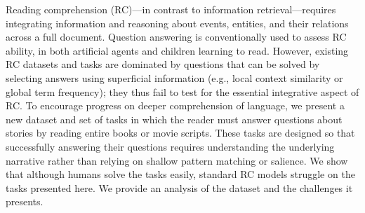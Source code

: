 Reading comprehension (RC)---in contrast to information retrieval---requires integrating information and reasoning about events, entities, and their relations across a full document. Question answering is conventionally used to assess RC ability, in both artificial agents and children learning to read. However, existing RC datasets and tasks are dominated by questions that can be solved by selecting answers using superficial information (e.g., local context similarity or global term frequency); they thus fail to test for the essential integrative aspect of RC. To encourage progress on deeper comprehension of language, we present a new dataset and set of tasks in which the reader must answer questions about stories by reading entire books or movie scripts. These tasks are designed so that successfully answering their questions requires understanding the underlying narrative rather than relying on shallow pattern matching or salience. We show that although humans solve the tasks easily, standard RC models struggle on the tasks presented here. We provide an analysis of the dataset and the challenges it presents.